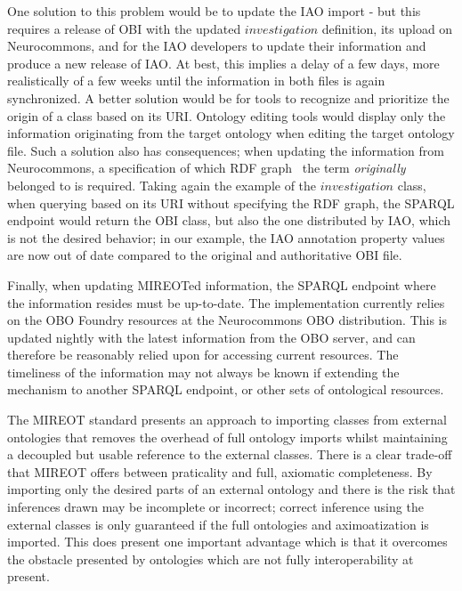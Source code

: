 \documentclass[jou]{ao2e}%
\begin{document}
One solution to this problem would be to update the \ac{IAO} import - but this requires a release of \ac{OBI} with the updated $investigation$ definition, its upload on Neurocommons, and for the \ac{IAO} developers to update their information and produce a new release of \ac{IAO}. At best, this implies a delay of a few days, more realistically of a few weeks until the information in both files is again synchronized.
A better solution would be for tools to recognize and prioritize the origin of a class based on its URI. Ontology editing tools would display only the information originating from the target ontology when editing the target ontology file.
Such a solution also has consequences; when updating the information from Neurocommons, a specification of which \ac{RDF} graph~\citep{RDF} the term \emph{originally} belonged to is required. Taking again the example of the $investigation$ class, when querying based on its URI without specifying the RDF graph, the SPARQL endpoint would return the \ac{OBI} class, but also the one distributed by \ac{IAO}, which is not the desired behavior; in our example, the \ac{IAO} annotation property values are now out of date compared to the original and authoritative \ac{OBI} file. %

Finally, when updating MIREOTed information, the SPARQL endpoint where the information resides must be up-to-date. The implementation currently relies on the \ac{OBO} Foundry resources at the Neurocommons \ac{OBO} distribution. This is updated nightly with the latest information from the \ac{OBO} server, and can therefore be reasonably relied upon for accessing current resources. The timeliness of the information may not always be known if extending the mechanism to another SPARQL endpoint, or other sets of ontological resources.

The \ac{MIREOT} standard presents an approach to importing classes from external ontologies that removes the overhead of full ontology imports whilst maintaining a decoupled but usable reference to the external classes. There is a clear trade-off that \ac{MIREOT} offers between praticality and full, axiomatic completeness. By importing only the desired parts of an external ontology and there is the risk that inferences drawn may be incomplete or incorrect; correct inference using the external classes is only guaranteed if the full ontologies and aximoatization is imported. This does present one important advantage which is that it overcomes the obstacle presented by ontologies which are not fully interoperability at present.
\end{document}
